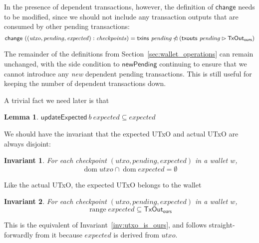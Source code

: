 \documentclass{article}
\newcommand{\restrictdom}{\lhd}
\newcommand{\subtractdom}{\mathbin{\slashed{\restrictdom}}}
\newcommand{\restrictrange}{\rhd}
\DeclareMathOperator{\dom}{dom}
\DeclareMathOperator{\range}{range}
\newtheorem{lemma}{Lemma}
\newtheorem{invariant}{Invariant}
\begin{document}
In the presence of dependent transactions, however, the definition of
$\mathsf{change}$ needs to be modified, since we should not include any
transaction outputs that are consumed by other pending transactions:
%
\begin{equation*}
  \mathsf{change} ~ ((\mathit{utxo}, \mathit{pending}, \mathit{expected}) : \mathit{checkpoints})
= \mathsf{txins} ~ \mathit{pending} \subtractdom (\mathsf{txouts} ~ \mathit{pending} \restrictrange \mathsf{TxOut_{ours}})
\end{equation*}

The remainder of the definitions from Section~\ref{sec:wallet_operations} can
remain unchanged, with the side condition to $\mathsf{newPending}$ continuing to
ensure that we cannot introduce any \emph{new} dependent pending transactions.
This is still useful for keeping the number of dependent transactions down.


A trivial fact we need later is that
%
\begin{lemma} \label{lemma:updateExpected_is_filter}
\begin{math}
\mathsf{updateExpected} ~ b ~ \mathit{expected} \subseteq \mathit{expected}
\end{math}
\end{lemma}

We should have the invariant that the expected UTxO and actual UTxO are always disjoint:

\begin{invariant}
For each checkpoint $(\mathit{utxo}, \mathit{pending}, \mathit{expected})$ in a wallet $w$,
\begin{equation*}
\dom \mathit{utxo} \cap \dom \mathit{expected} = \emptyset
\end{equation*}
\end{invariant}

Like the actual UTxO, the expected UTxO belongs to the wallet

\begin{invariant}
For each checkpoint $(\mathit{utxo}, \mathit{pending}, \mathit{expected})$ in a wallet $w$,
\begin{equation*}
\range \mathit{expected} \subseteq \mathsf{TxOut}_\mathsf{ours}
\end{equation*}
\end{invariant}

This is the equivalent of Invariant~\ref{inv:utxo_is_ours}, and follows
straight-forwardly from it because $\mathit{expected}$ is derived from
$\mathit{utxo}$.
\end{document}

